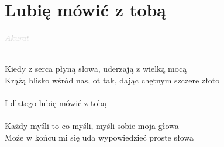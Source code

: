 \documentclass[a5paper, 10pt]{book}
\begin{document}
\section{Lubię mówić z tobą}\textcolor{lightgray}{\textit{Akurat}}\\~\\
\begin{minipage}[t]{0.8\textwidth}
Kiedy z serca płyną słowa, uderzają z wielką mocą\\
Krążą blisko wśród nas, ot tak, dając chętnym szczere złoto\\
\\
\hspace*{5mm}I dlatego lubię mówić z tobą\\
\\
Każdy myśli to co myśli, myśli sobie moja głowa\\
Może w końcu mi się uda wypowiedzieć proste słowa\\
\end{minipage}
\end{document}
